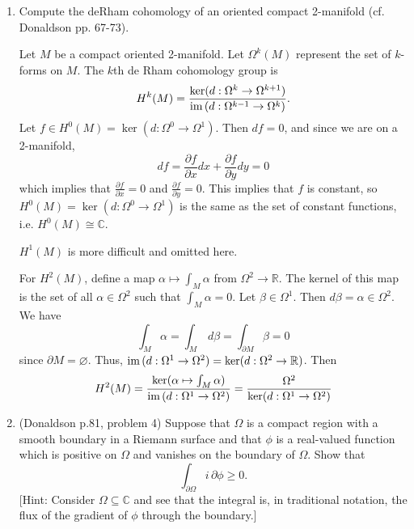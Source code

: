 \documentclass[11pt,oneside,english]{amsart}
\theoremstyle{definition}
\newcommand{\pp}[2]{\frac{\partial{#1}}{\partial{#2}}}
\newcommand{\MB}[1]{\mathbb{#1}}
\newcommand{\im}{\text{im\,}}
\begin{document}
\begin{enumerate}[leftmargin=*]
\begin{proof}
Let $\alpha=f\,dz$ be our one-form. Since $f$ is meromorphic and $M$ is compact, the set of poles of $f$ is discrete and finite. Let $p:\MB{R}\to\MB{R}$ be the standard mollifier so that it is 1 on a neighborhood of 0 and $O(\frac{1}{t})$ for large $t$. Define $\tilde \alpha=p(|\alpha|^2)\alpha$ where $|\alpha|=\frac{|f(z)|}{R}$ where $R$ is the area form determined by $R \,dx\wedge dy$. Then the set of zeroes of $\tilde \alpha$ is the set of zeroes and poles of $\alpha$ by construction: notice that as $|\alpha|\to\infty$, $p(|\alpha|^2)\to0$. More specifically,
\[
\tilde \alpha=\frac{R}{|f(z)|^2}f(z)\,dz=\frac{R}{f(z)\overline{f(z)}}f(z)\,dz=\frac{R}{\overline{f(z)}}\,dz=R\cdot\overline{\left(\frac{1}{f(z)}\right)}\,dz.
\]
The zeroes of $\tilde \alpha$ that correspond to the poles of $\alpha$ have a multiplicity that is the opposite the order of the pole. Thus $Z=P$, and by the Hopf principle,
\[
Z-P=\sum_{p\in\ker\alpha}m_p(\alpha)=-\chi(M)=-(2-2g)=2g-2.
\]
\end{proof}


\item Compute the deRham cohomology of an oriented compact  2-manifold (cf. Donaldson  pp. 67-73).

Let $M$ be a compact oriented 2-manifold. Let $\Omega^k(M)$ represent the set of $k$-forms on $M$. The $k$th de Rham cohomology group is
\[
H^k(M)=\frac{\ker(d:\Omega^k\to\Omega^{k+1})}{\im(d:\Omega^{k-1}\to\Omega^k)}.
\]
Let $f\in H^0(M)=\ker(d:\Omega^0\to\Omega^1)$. Then $df=0$, and since we are on a 2-manifold,
\[
df=\pp{f}{x}dx+\pp{f}{y}dy=0
\]
which implies that $\pp{f}{x}=0$ and $\pp{f}{y}=0$. This implies that $f$ is constant, so $H^0(M)=\ker(d:\Omega^0\to\Omega^1)$ is the same as the set of constant functions, i.e. $H^0(M)\cong \MB{C}$.

$H^1(M)$ is more difficult and omitted here.

For $H^2(M)$, define a map $\alpha\mapsto\int_M\alpha$ from $\Omega^2\to \MB{R}$. The kernel of this map is the set of all $\alpha\in \Omega^2$ such that $\int_M\alpha=0$. Let $\beta\in \Omega^1$. Then $d\beta=\alpha\in \Omega^2$. We have
\[
\int_M\alpha=\int_M\,d\beta=\int_{\partial M}\beta=0
\]
since $\partial M=\varnothing$. Thus, $\im(d:\Omega^1\to\Omega^2)=\ker(d:\Omega^2\to\MB{R})$. Then
\[
H^2(M)=\frac{\ker(\alpha\mapsto\int_M\alpha)}{\im(d:\Omega^1\to\Omega^2)}=\frac{\Omega^2}{\ker(d:\Omega^1\to\Omega^2)}
\]

\item (Donaldson p.81, problem 4) Suppose that $\Omega$ is a compact region with a smooth boundary in a Riemann surface and that $\phi$ is a real-valued function which is positive on $\Omega$ and vanishes on the boundary of $\Omega$. Show that
\[
\int_{\partial \Omega}i\,\partial\phi\geq 0.
\]
[Hint: Consider $\Omega\subseteq \MB{C}$ and see that the integral is, in traditional notation, the flux of the gradient of $\phi$ through the boundary.]


\end{enumerate}
\end{document}
